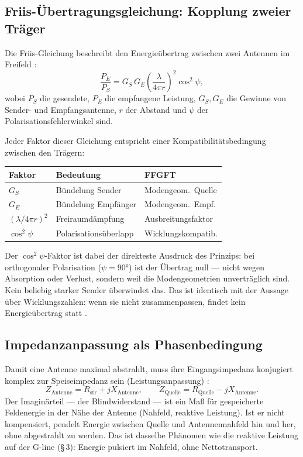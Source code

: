 \subsection*{Friis-Übertragungsgleichung: Kopplung zweier Träger}

Die Friis-Gleichung beschreibt den Energieübertrag zwischen zwei Antennen
im Freifeld \cite{Friis1946,Balanis2016}:
\[
  \frac{P_E}{P_S} = G_S\,G_E\left(\frac{\lambda}{4\pi r}\right)^2
  \cos^2\psi,
\]
wobei $P_S$ die gesendete, $P_E$ die empfangene Leistung, $G_S, G_E$ die
Gewinne von Sender- und Empfangsantenne, $r$ der Abstand und $\psi$ der
Po\-la\-ri\-sa\-ti\-ons\-feh\-ler\-win\-kel sind.

Jeder Faktor dieser Gleichung entspricht einer Kom\-pa\-ti\-bi\-li\-täts\-be\-din\-gung
zwischen den Trägern:

\begin{center}
\begin{tabular}{@{}lp{2.8cm}p{2.8cm}@{}}
\toprule
\textbf{Faktor} & \textbf{Bedeutung} & \textbf{FFGFT} \\
\midrule
$G_S$ & Bündelung Sender & Modengeom.\ Quelle \\
$G_E$ & Bündelung Empfänger & Modengeom.\ Empf. \\
$(\lambda/4\pi r)^2$ & Freiraumdämpfung & Ausbreitungsfaktor \\
$\cos^2\psi$ & Polarisationsüberlapp & Wicklungskompatib. \\
\bottomrule
\end{tabular}
\end{center}

Der $\cos^2\psi$-Faktor ist dabei der direkteste Ausdruck des Prinzips:
bei orthogonaler Polarisation ($\psi=90°$) ist der Übertrag null ---
nicht wegen Absorption oder Verlust, sondern weil die Modengeometrien
unverträglich sind. Kein beliebig starker Sender überwindet das.
Das ist identisch mit der Aussage über Wicklungszahlen: wenn sie nicht
zusammenpassen, findet kein Energieübertrag statt \SM.

\subsection*{Impedanzanpassung als Phasenbedingung}

Damit eine Antenne maximal abstrahlt, muss ihre Eingangsimpedanz
konjugiert komplex zur Speiseimpedanz sein (Leistungsanpassung) \EM:
\[
  Z_\mathrm{Antenne} = R_\mathrm{str} + jX_\mathrm{Antenne}, \qquad
  Z_\mathrm{Quelle} = R_\mathrm{Quelle} - jX_\mathrm{Antenne}.
\]
Der Imaginärteil --- der Blindwiderstand --- ist ein Maß für gespeicherte
Feldenergie in der Nähe der Antenne (Nahfeld, reaktive Leistung). Ist er
nicht kompensiert, pendelt Energie zwischen Quelle und Antennennahfeld hin
und her, ohne abgestrahlt zu werden. Das ist dasselbe Phänomen wie die
reaktive Leistung auf der G-line (§\,3): Energie pulsiert im Nahfeld,
ohne Nettotransport.

